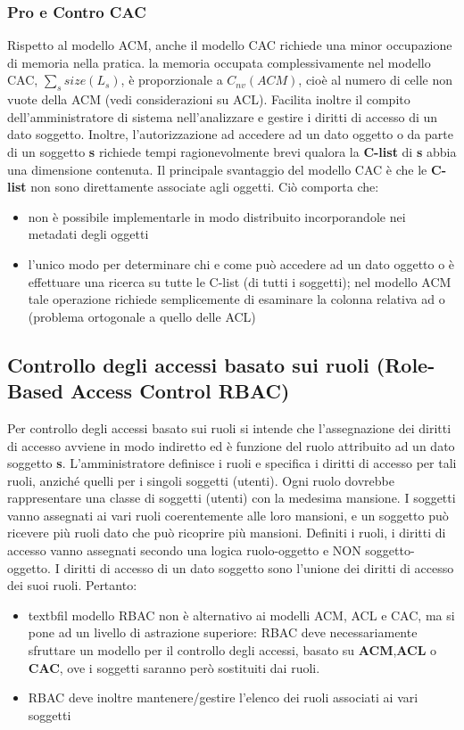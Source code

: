 \subsubsection{Pro e Contro CAC}
Rispetto al modello ACM, anche il modello CAC richiede una minor occupazione di memoria nella pratica. la memoria occupata complessivamente nel modello CAC,  $\sum_{s} size(L_{s})$, è proporzionale a $C_{nv} (ACM)$, cioè al numero di celle non vuote della ACM (vedi considerazioni su ACL). Facilita inoltre il compito dell'amministratore di sistema nell'analizzare e gestire i diritti di accesso di un dato soggetto. Inoltre, l'autorizzazione ad accedere ad un dato oggetto o da parte di un soggetto \textbf{s} richiede tempi ragionevolmente brevi qualora la \textbf{C-list} di \textbf{s} abbia una dimensione contenuta.\newline \newline
Il principale svantaggio del modello CAC è che le \textbf{C-list} non sono direttamente associate agli oggetti. Ciò comporta che:
\begin{itemize} 
  \item non è possibile implementarle in modo distribuito incorporandole nei metadati degli oggetti
  \item l'unico modo per determinare chi e come può accedere ad un dato oggetto o è effettuare una ricerca su tutte le C-list (di tutti i soggetti); nel modello ACM tale operazione richiede semplicemente di esaminare la colonna relativa ad o (problema ortogonale a quello delle ACL)
\end{itemize}

\subsection{Controllo degli accessi basato sui ruoli (Role-Based Access Control RBAC)}
Per controllo degli accessi basato sui ruoli si intende che l'assegnazione dei diritti di accesso avviene in modo indiretto ed è funzione del ruolo attribuito ad un dato soggetto \textbf{s}. L’amministratore definisce i ruoli e specifica i diritti di accesso per tali ruoli, anziché quelli per i singoli soggetti (utenti). Ogni ruolo dovrebbe rappresentare una classe di soggetti (utenti) con la medesima mansione. I soggetti vanno assegnati ai vari ruoli coerentemente alle loro mansioni, e un soggetto può ricevere più ruoli dato che può ricoprire più mansioni. Definiti i ruoli, i diritti di accesso vanno assegnati secondo una logica ruolo-oggetto e NON soggetto-oggetto. I diritti di accesso di un dato soggetto sono l’unione dei diritti di accesso dei suoi ruoli. Pertanto:
\begin{itemize} 
  \item textbf{il modello RBAC non è alternativo ai modelli ACM, ACL e CAC, ma si pone ad un livello di astrazione superiore}: RBAC deve necessariamente sfruttare un modello per il controllo degli accessi, basato su \textbf{ACM},\textbf{ACL} o \textbf{CAC}, ove i soggetti saranno però sostituiti dai ruoli.
  \item RBAC deve inoltre mantenere/gestire l'elenco dei ruoli associati ai vari soggetti
\end{itemize}

